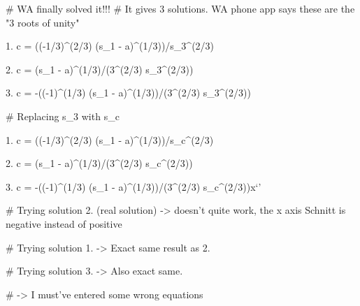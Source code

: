 # WA finally solved it!!!
# It gives 3 solutions. WA phone app says these are the "3 roots of unity"

1. c = ((-1/3)^(2/3) (s_1 - a)^(1/3))/s_3^(2/3)

2. c = (s_1 - a)^(1/3)/(3^(2/3) s_3^(2/3))

3. c = -((-1)^(1/3) (s_1 - a)^(1/3))/(3^(2/3) s_3^(2/3))

# Replacing s_3 with s_c

1. c = ((-1/3)^(2/3) (s_1 - a)^(1/3))/s_c^(2/3)

2. c = (s_1 - a)^(1/3)/(3^(2/3) s_c^(2/3))

3. c = -((-1)^(1/3) (s_1 - a)^(1/3))/(3^(2/3) s_c^(2/3))x`'

# Trying solution 2. (real solution) -> doesn't quite work, the x axis Schnitt is negative instead of positive

# Trying solution 1. -> Exact same result as 2.

# Trying solution 3. -> Also exact same. 

# -> I must've entered some wrong equations
